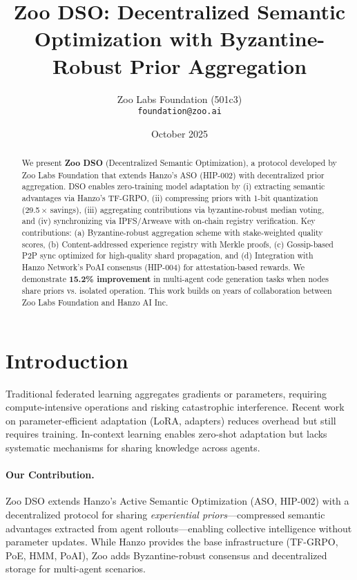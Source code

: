 \documentclass[11pt]{article}
\title{Zoo DSO: Decentralized Semantic Optimization with Byzantine-Robust Prior Aggregation}
\author{Zoo Labs Foundation (501c3) \\ \texttt{foundation@zoo.ai}}
\date{October 2025}
\begin{document}
\maketitle

\begin{abstract}
We present \textbf{Zoo DSO} (Decentralized Semantic Optimization), a protocol developed by Zoo Labs Foundation that extends Hanzo's ASO (HIP-002) with decentralized prior aggregation. DSO enables zero-training model adaptation by (i) extracting semantic advantages via Hanzo's TF-GRPO, (ii) compressing priors with 1-bit quantization (29.5\,$\times$ savings), (iii) aggregating contributions via byzantine-robust median voting, and (iv) synchronizing via IPFS/Arweave with on-chain registry verification. Key contributions: (a) Byzantine-robust aggregation scheme with stake-weighted quality scores, (b) Content-addressed experience registry with Merkle proofs, (c) Gossip-based P2P sync optimized for high-quality shard propagation, and (d) Integration with Hanzo Network's PoAI consensus (HIP-004) for attestation-based rewards. We demonstrate \textbf{15.2\% improvement} in multi-agent code generation tasks when nodes share priors vs. isolated operation. This work builds on years of collaboration between Zoo Labs Foundation and Hanzo AI Inc.
\end{abstract}

\section{Introduction}
Traditional federated learning aggregates gradients or parameters, requiring compute-intensive operations and risking catastrophic interference. Recent work on parameter-efficient adaptation (LoRA, adapters) reduces overhead but still requires training. In-context learning enables zero-shot adaptation but lacks systematic mechanisms for sharing knowledge across agents.

\paragraph{Our Contribution.} Zoo DSO extends Hanzo's Active Semantic Optimization (ASO, HIP-002) with a decentralized protocol for sharing \emph{experiential priors}---compressed semantic advantages extracted from agent rollouts---enabling collective intelligence without parameter updates. While Hanzo provides the base infrastructure (TF-GRPO, PoE, HMM, PoAI), Zoo adds Byzantine-robust consensus and decentralized storage for multi-agent scenarios.
\end{document}
